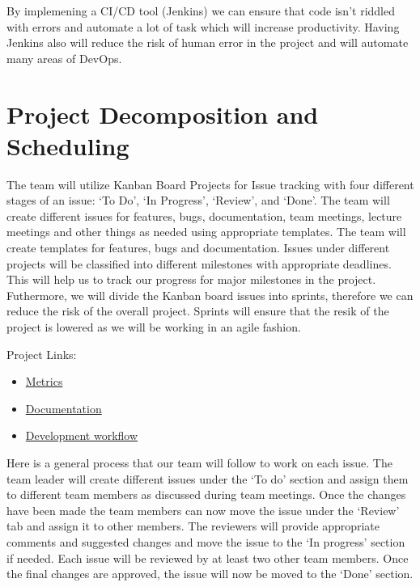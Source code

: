 \documentclass{article}
\begin{document}
By implemening a CI/CD tool (Jenkins) we can ensure that code isn't riddled with errors and automate a lot of task which will increase productivity. Having Jenkins also will reduce the risk of human error in the project and will automate many areas of DevOps. 

\section{Project Decomposition and Scheduling}

The team will utilize Kanban Board Projects for Issue tracking with four different stages of an issue: ‘To Do’, ‘In Progress’, ‘Review’, and ‘Done’. The team will create different issues for features, bugs, documentation, team meetings, lecture meetings and other things as needed using appropriate templates. The team will create templates for features, bugs and documentation. Issues under different projects will be classified into different milestones with appropriate deadlines. This will help us to track our progress for major milestones in the project. 
Futhermore, we will divide the Kanban board issues into sprints, therefore we can reduce the risk of the overall project. Sprints will ensure that the resik of the project is lowered as we will be working in an agile fashion.

Project Links:
\begin{itemize}
\item  
\href{https://github.com/users/Inreet-Kaur/projects/4}{Metrics}
\item  
\href{https://github.com/users/Inreet-Kaur/projects/2}{Documentation} 
\item 
\href{https://github.com/users/Inreet-Kaur/projects/6}{Development workflow}
\end{itemize}

Here is a general process that our team will follow to work on each issue. The team leader will create different issues under the ‘To do’ section and assign them to different team members as discussed during team meetings. Once the changes have been made the team members can now move the issue under the ‘Review’ tab and assign it to other members. The reviewers will provide appropriate comments and suggested changes and move the issue to the ‘In progress’ section if needed. Each issue will be reviewed by at least two other team members. Once the final changes are approved, the issue will now be moved to the ‘Done’ section. 
\end{document}
